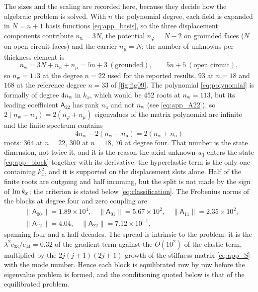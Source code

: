 The sizes and the scaling are recorded here, because they decide how the
algebraic problem is solved.  With $n$ the polynomial degree, each field is
expanded in $N=n+1$ basis functions \eqref{eq:app_basis}, so the three
displacement components contribute $n_{\mathrm u}=3N$, the potential
$n_\varphi=N-2$ on grounded faces ($N$ on open-circuit faces)
and the carrier $n_\mu=N$; the number of unknowns per thickness element is
\begin{equation}
\label{eq:nw}
n_{\mathrm{w}}=3N+n_\varphi+n_\mu=5n+3\ (\text{grounded}),\qquad
5n+5\ (\text{open circuit}),
\end{equation}
so $n_{\mathrm{w}}=113$ at the degree $n=22$ used for the reported results,
$93$ at $n=18$ and $168$ at the reference degree $n=33$ of \cref{fig:fig09}.  The polynomial
\eqref{eq:polynomial} is formally of degree $4n_{\mathrm{w}}$ in $k_x$, which
would be $452$ roots at $n_{\mathrm{w}}=113$, but its leading coefficient
$\mathsf A_{22}$ has rank $n_{\mathrm u}$ and not $n_{\mathrm{w}}$ (see \eqref{eq:app_A22}), so $2(n_{\mathrm{w}}-n_{\mathrm u})=2(n_\varphi+n_\mu)$
eigenvalues of the matrix polynomial are infinite and the finite spectrum
contains
\begin{equation}
\label{eq:finite_roots}
4n_{\mathrm{w}}-2(n_{\mathrm{w}}-n_{\mathrm u})=2(n_{\mathrm{w}}+n_{\mathrm u})
\end{equation}
roots: $364$ at $n=22$, $300$ at $n=18$, $76$ at degree four.  That number is the
state dimension, not twice it, and it is the reason the axial unknown $u_3$ enters
the state \eqref{eq:app_block} together with its derivative: the hyperelastic term
is the only one containing $k_x^{2}$, and it is supported on the displacement
slots alone.  Half of the finite roots are outgoing and half incoming, but the
split is not made by the sign of $\operatorname{Im} k_x$; the criterion is stated below
\eqref{eq:classification}.  The Frobenius norms of the blocks at degree
four and zero coupling are
\begin{equation*}
\begin{aligned}
&\|\mathsf A_{00}\|=1.89\times10^{4},\quad
\|\mathsf A_{01}\|=5.67\times10^{2},\quad
\|\mathsf A_{11}\|=2.35\times10^{2},\\
&\|\mathsf A_{12}\|=4.04,\quad
\|\mathsf A_{22}\|=7.12\times10^{-1},
\end{aligned}
\end{equation*}
spanning four and a half decades.  The spread is intrinsic to the problem: it is the
$\lambda^2c_{33}/c_{44}=0.32$ of the gradient term against the $O(10^{2})$ of
the elastic term, multiplied by the $2j(j+1)(2j+1)$ growth of the stiffness
matrix \eqref{eq:app_S} with the mode number.  Hence each block is equilibrated row by row before the eigenvalue problem is formed, and the
conditioning quoted below is that of the equilibrated problem.

